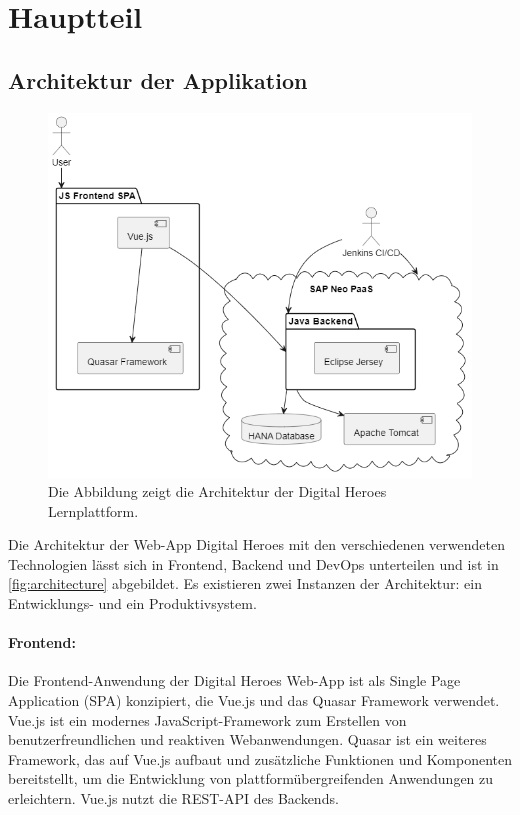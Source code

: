 \chapter{Hauptteil}

\section{Architektur der Applikation}

\begin{figure}
	\centering
	\includegraphics[width=.72\textwidth]{Bilder/architecture.png} 
	\caption{Die Abbildung zeigt die Architektur der Digital Heroes Lernplattform.}
	\label{fig:architecture}
\end{figure} 

Die Architektur der Web-App Digital Heroes mit den verschiedenen verwendeten Technologien
lässt sich in Frontend, Backend und DevOps unterteilen und 
ist in \autoref{fig:architecture} abgebildet. 
Es existieren zwei Instanzen der Architektur: ein Entwicklungs- und ein Produktivsystem. 

\subsubsection*{Frontend:}

Die Frontend-Anwendung der Digital Heroes Web-App ist als Single Page Application (SPA) konzipiert, 
die Vue.js und das Quasar Framework verwendet. 
Vue.js ist ein modernes JavaScript-Framework zum Erstellen von benutzerfreundlichen und reaktiven Webanwendungen.
Quasar ist ein weiteres Framework, das auf Vue.js aufbaut und zusätzliche Funktionen und Komponenten bereitstellt, 
um die Entwicklung von plattformübergreifenden Anwendungen zu erleichtern.
Vue.js nutzt die REST-API des Backends.

